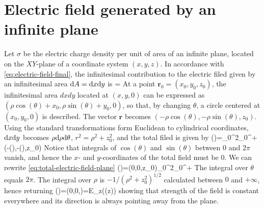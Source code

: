 \section{Electric field generated by an infinite plane}
Let $\sigma$ be the electric charge density per unit of area of an infinite plane, located on the $XY$-plane of a coordinate system $(x,y,z)$. In accordance with \ref{eq:electric-field-final}, the infinitesimal contribution to the electric filed given by an infinitesimal area $\mathrm{d}A=\mathrm{d}x\mathrm{d}y$ is
\be
{}=
\ee
At a point $\mathbf{r}_{0}=(x_{0},y_{0},z_{0})$, the infinitesimal area $dxdy$ located at $(x,y,0)$ can be expressed as $(\rho\cos(\theta)+x_{0},\rho\sin(\theta)+y_{0},0)$, so that, by changing $\theta$, a circle centered at $(x_{0},y_{0},0)$ is described. The vector $\mathbf{r}$ becomes $(-\rho\cos(\theta),-\rho\sin(\theta),z_{0})$.
Using the standard transformations form Euclidean to cylindrical coordinates, $\mathrm{d}x\mathrm{d}y$ becomes $\rho\mathrm{d}\rho\mathrm{d}\theta$, $r^{2}=\rho^{2}+z_{0}^{2}$, and the total filed is given by 
\be\label{eq:total-electric-field-plane}
()=\int_{0}^{2\pi}\total{\theta}\int_{0}^{+\infty}\total{\rho}(-\rho\cos(\theta),-\rho\sin(\theta),z_{0})
\ee
Notice that integrals of $\cos(\theta)$ and $\sin(\theta)$ between $0$ and $2\pi$ vanish, and hence the $x$- and $y$-coordinates of the total field must be $0$. We can rewrite \ref{eq:total-electric-field-plane}
\be\label{eq:total-electric-field-plane-simplified}
()=(0,0,z_{0})\int_{0}^{2\pi}\total{\theta}\int_{0}^{+\infty}\total{\rho}
\ee
The integral over $\theta$ equals $2\pi$. The integral over $\rho$ is $-1/(\rho^{2}+z_{0}^{2})^{1/2}$ calculated between $0$ and $+\infty$, hence returning
\be\label{eq:total-electric-field-plane-final}
()=(0,0,)=E_{z}(\sign(z))
\ee
showing that strength of the field is constant everywhere and its direction is always pointing away from the plane.